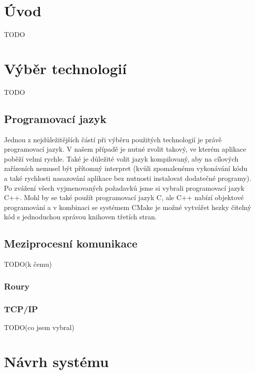 \chapter{Úvod}
TODO

\chapter{Výběr technologií}

TODO

\section{Programovací jazyk}

Jednou z nejdůležitějších částí při výběru použitých technologií je právě programovací jazyk. V našem případě je nutné zvolit takový, ve kterém aplikace poběží velmi rychle. Také je důležité volit jazyk kompilovaný, aby na cílových zařízeních nemusel být přítomný interpret (kvůli zpomalenému vykonávání kódu a také rychlosti nasazování aplikace bez nutnosti instalovat dodatečné programy). Po zvážení všech vyjmenovaných požadavků jsme si vybrali programovací jazyk C++. Mohl by se také použít programovací jazyk C, ale C++ nabízí objektové programování a v kombinaci se systémem CMake je možné vytvářet hezky čitelný kód s jednoduchou správou knihoven třetích stran.




\section{Meziprocesní komunikace}
TODO(k čemu)
\subsection{Roury}
\subsection{TCP/IP}
TODO(co jsem vybral)



\chapter{Návrh systému}

